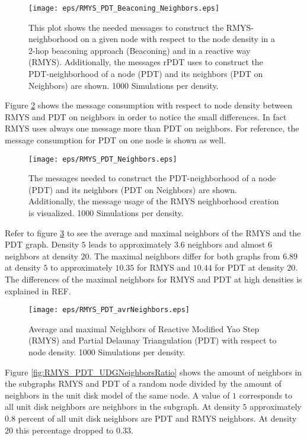 \begin{figure}[h!]
\centering
\texttt{[image: eps/RMYS\_PDT\_Beaconing\_Neighbors.eps]}
\caption{This plot shows the needed messages to construct the RMYS-neighborhood on a given node with respect to the node density in a 2-hop beaconing approach (Beaconing) and in a reactive way (RMYS). Additionally, the messages rPDT uses to construct the PDT-neighborhood of a node (PDT) and its neighbors (PDT on Neighbors) are shown. 1000 Simulations per density.}
\label{fig:RMYS_PDT_Beaconing_Neighbors.eps}
\end{figure}

Figure \ref{fig:RMYS_PDT_Neighbors} shows the message consumption with respect to node density between RMYS and PDT on neighbors in order to notice the small differences.
In fact RMYS uses always one message more than PDT on neighbors.
For reference, the message consumption for PDT on one node is shown as well.

\begin{figure}[h!]
\centering
\texttt{[image: eps/RMYS\_PDT\_Neighbors.eps]}
\caption{The messages needed to construct the PDT-neighborhood of a node (PDT) and its neighbors (PDT on Neighbors) are shown. Additionally, the message usage of the RMYS neighborhood creation is visualized. 1000 Simulations per density.}
\label{fig:RMYS_PDT_Neighbors}
\end{figure}


Refer to figure \ref{fig:RMYS_PDT_avrNeighbors} to see the average and maximal neighbors of the RMYS and the PDT graph.
Density $5 $ leads to approximately $3.6 $ neighbors and almost $6 $ neighbors at density $20 $.
The maximal neighbors differ for both graphs from $6.89 $ at density $5 $ to approximately $10.35 $ for RMYS and $10.44 $ for PDT at density $20 $.
The differences of the maximal neighbors for RMYS and PDT at high densities is explained in REF.

\begin{figure}[h!]
\centering
\texttt{[image: eps/RMYS\_PDT\_avrNeighbors.eps]}
\caption{Average and maximal Neighbors of Reactive Modified Yao Step (RMYS) and Partial Delaunay Triangulation (PDT) with respect to node density. 1000 Simulations per density.}
\label{fig:RMYS_PDT_avrNeighbors}
\end{figure}


Figure \ref{fig:RMYS_PDT_UDGNeighborsRatio} shows the amount of neighbors in the subgraphs RMYS and PDT of a random node divided by the amount of neighbors in the unit disk model of the same node.
A value of $1 $ corresponds to all unit disk neighbors are neighbors in the subgraph.
At density $5 $ approximately $0.8 $ percent of all unit disk neighbors are PDT and RMYS neighbors.
At density $20 $ this percentage dropped to $0.33 $.

